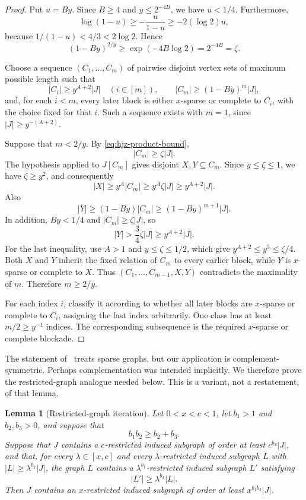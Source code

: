 \documentclass[11pt]{article}
\numberwithin{equation}{section}
\theoremstyle{plain}
\newtheorem{lemma}[theorem]{Lemma}
\theoremstyle{definition}
\begin{document}
\begin{proof}
Put $u=By$.  Since $B\geq4$ and $y\leq2^{-4B}$, we have $u<1/4$.
Furthermore,
\[
 \log(1-u)\geq-\frac{u}{1-u}\geq-2(\log 2)u,
\]
because $1/(1-u)<4/3<2\log 2$.  Hence
\begin{equation}
        (1-By)^{2/y}\geq
        \exp(-4B\log 2)=2^{-4B}=\zeta.
\label{eq:hjz-product-bound}
\end{equation}

Choose a sequence $(C_1,\ldots,C_m)$ of pairwise disjoint vertex sets
of maximum possible length such
that
\[
 |C_i|\geq y^{A+2}|J|\quad(i\in[m]),\qquad
 |C_m|\geq(1-By)^m|J|,
\]
and, for each $i<m$, every later block is either $x$-sparse or
complete to $C_i$, with the choice fixed for that $i$.  Such a sequence
exists with $m=1$, since $|J|\geq y^{-(A+2)}$.

Suppose that $m<2/y$.  By
\eqref{eq:hjz-product-bound},
\[
                   |C_m|\geq\zeta|J|.
\]
The hypothesis applied to $J[C_m]$ gives disjoint $X,Y\subseteq C_m$.
Since $y\leq\zeta\leq1$, we have $\zeta\geq y^2$, and consequently
\[
       |X|\geq y^A|C_m|
             \geq y^A\zeta|J|
             \geq y^{A+2}|J|.
\]
Also
\[
       |Y|\geq(1-By)|C_m|
             \geq(1-By)^{m+1}|J|.
\]
In addition, $By<1/4$ and $|C_m|\geq\zeta|J|$, so
\[
 |Y|>\frac{3}{4}\zeta|J|
       \geq y^{A+2}|J|.
\]
For the last inequality, use $A>1$ and
$y\leq\zeta\leq1/2$, which give
$y^{A+2}\leq y^3\leq\zeta/4$.
Both $X$ and $Y$ inherit the fixed relation of $C_m$ to every earlier
block, while $Y$ is $x$-sparse or complete to $X$.  Thus
$(C_1,\ldots,C_{m-1},X,Y)$ contradicts the maximality of $m$.
Therefore $m\geq2/y$.

For each index $i$, classify it according to whether all later blocks
are $x$-sparse or complete to $C_i$, assigning the last index
arbitrarily.  One class has at least $m/2\geq y^{-1}$ indices.
The corresponding subsequence is the required $x$-sparse or complete
blockade.
\end{proof}

The statement of~\cite[Lemma~2.9]{HuangJuZhou2026} treats sparse graphs,
but our application is complement-symmetric.  Perhaps complementation
was intended implicitly.  We therefore prove the restricted-graph
analogue needed below.  This is a variant, not a restatement, of that
lemma.

\begin{lemma}[Restricted-graph iteration]
\label{lem:hjz-restricted-iteration}
Let $0<x<c<1$, let $b_1>1$ and $b_2,b_3>0$, and suppose that
\[
                         b_1b_2\geq b_2+b_3.
\]
Suppose that $J$ contains a $c$-restricted induced subgraph of order at
least $c^{b_2}|J|$, and that, for every $\lambda\in[x,c]$ and every
$\lambda$-restricted induced subgraph $L$ with
$|L|\geq\lambda^{b_2}|J|$, the graph $L$ contains a
$\lambda^{b_1}$-restricted induced subgraph $L'$ satisfying
\[
                         |L'|\geq\lambda^{b_3}|L|.
\]
Then $J$ contains an $x$-restricted induced subgraph of order at least
$x^{b_1b_2}|J|$.
\end{lemma}
\end{document}
